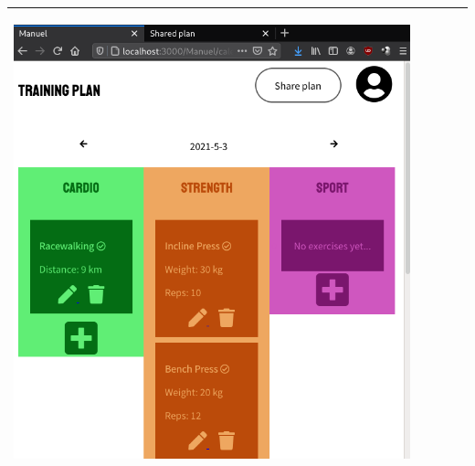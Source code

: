\documentclass[12pt,twoside,titlepage,a4paper]{article}
\theoremstyle{definicion}
\theoremstyle{lema}
\theoremstyle{teorema}
\theoremstyle{corolario}
\theoremstyle{ejemplo}
\theoremstyle{nota}
\begin{document}
\begin{table}[!h]
\begin{tabular}{|m{0.6cm}|m{2.9cm}|m{3.6cm}|m{1.1cm}|m{5.9cm}|}
		\begin{center}\includegraphics[scale=0.22]{calendar4.png}\end{center} \\
		\hline
	\end{tabular}
\end{table}
\newpage
\end{document}
